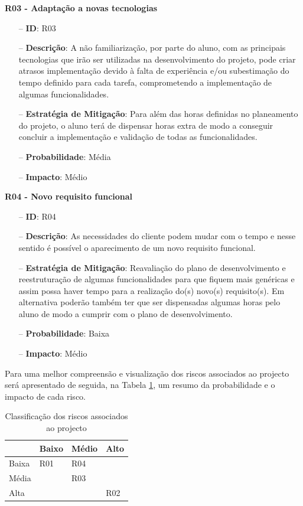 \textbf{R03 - Adaptação a novas tecnologias }
\begin{itemize}
	\item[--] \textbf{ID}: R03
	\item[--] \textbf{Descrição}: A não familiarização, por parte do aluno, com as principais tecnologias que irão ser utilizadas na desenvolvimento do projeto, pode criar atrasos implementação devido à falta de experiência e/ou subestimação do tempo definido para cada tarefa, comprometendo a implementação de algumas funcionalidades.
	\item[--] \textbf{Estratégia de Mitigação}: Para além das horas definidas no planeamento do projeto, o aluno terá de dispensar horas extra de modo a conseguir concluir a implementação e validação de todas as funcionalidades.
	\item[--] \textbf{Probabilidade}: Média
	\item[--] \textbf{Impacto}: Médio
\end{itemize}

\textbf{R04 - Novo requisito funcional}
\begin{itemize}
	\item[--] \textbf{ID}: R04
	\item[--] \textbf{Descrição}: As necessidades do cliente podem mudar com o tempo e nesse sentido é possível o aparecimento de um novo requisito funcional.
	\item[--] \textbf{Estratégia de Mitigação}: Reavaliação do plano de desenvolvimento e reestruturação de algumas funcionalidades para que fiquem mais genéricas e assim possa haver tempo para a realização do(s) novo(s) requisito(s). Em alternativa poderão também ter que ser dispensadas algumas horas pelo aluno de modo a cumprir com o plano de desenvolvimento.
	\item[--] \textbf{Probabilidade}: Baixa 
	\item[--] \textbf{Impacto}: Médio
\end{itemize}

Para uma melhor compreensão e visualização dos riscos associados ao projecto será apresentado de seguida, na Tabela \ref{tab:riscos}, um resumo da probabilidade e o impacto de cada risco.

\pagebreak
\mbox{}
\begin{table}
	\centering
\begin{tabular}{ | l | l | l | l |}
	\hline
	\diagbox[width=15em]{Impacto}{Probabilidade}
	& Baixo & Médio & Alto\\
	\hline
	Baixa & \cellcolor{green}\centering R01 & \cellcolor{yellow}R04& \cellcolor{orange}\\
	\hline
	Média & \cellcolor{yellow} & \cellcolor{orange}R03 & \cellcolor{darkOrange}\\
	\hline
	Alta & \cellcolor{orange} & \cellcolor{darkOrange} & \cellcolor{red}R02\\
	\hline
\end{tabular}
\begin{center}
\caption {Classificação dos riscos associados ao projecto}
\label {tab:riscos}
\end{center}
\end{table}




